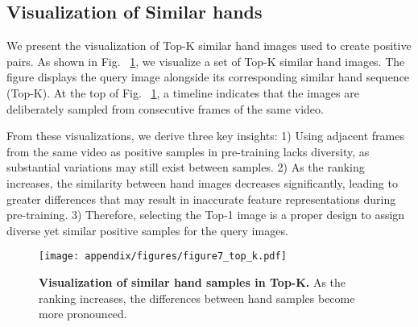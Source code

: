 \subsection{Visualization of Similar hands}\label{sec:appendix_vis_simhands}

We present the visualization of Top-K similar hand images used to create positive pairs. As shown in Fig. ~\ref{fig:similar_hands}, we visualize a set of Top-K similar hand images. The figure displays the query image alongside its corresponding similar hand sequence (Top-K). At the top of Fig. ~\ref{fig:similar_hands}, a timeline indicates that the images are deliberately sampled from consecutive frames of the same video. 

From these visualizations, we derive three key insights: 1) Using adjacent frames from the same video as positive samples in pre-training lacks diversity, as substantial variations may still exist between samples. 2) As the ranking increases, the similarity between hand images decreases significantly, leading to greater differences that may result in inaccurate feature representations during pre-training. 3) Therefore, selecting the Top-1 image is a proper design to assign diverse yet similar positive samples for the query images.

\begin{figure}[t!]
\vspace{-2mm}
    \begin{center}
    \texttt{[image: appendix/figures/figure7\_top\_k.pdf]}
    \end{center}
    \vspace{-3mm}
    \caption{
    \textbf{Visualization of similar hand samples in Top-K.} As the ranking increases, the differences between hand samples become more pronounced.
   }
    \label{fig:similar_hands}
    \vspace{-5mm}
\end{figure}
